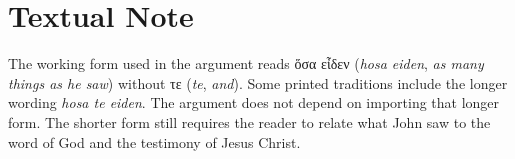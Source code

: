\section{Textual Note}

The working form used in the argument reads \textgreek{ὅσα εἶδεν} (\textit{hosa eiden}, \textit{as many things as he saw}) without \textgreek{τε} (\textit{te}, \textit{and}). Some printed traditions include the longer wording \textit{hosa te eiden}. The argument does not depend on importing that longer form. The shorter form still requires the reader to relate what John saw to the word of God and the testimony of Jesus Christ.
